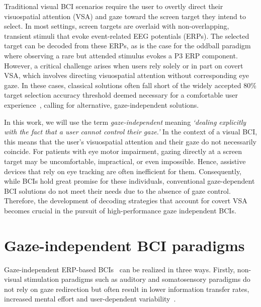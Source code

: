 Traditional visual BCI scenarios require the user to overtly direct their
visuospatial attention (VSA) and gaze toward the screen target they intend to select.
In most settings, screen targets are overlaid with non-overlapping, transient
stimuli that evoke event-related EEG potentials (ERPs).
The selected target can be decoded from these ERPs, as is the case for the
oddball paradigm where observing a rare but attended stimulus evokes a P3 ERP
component.
However, a critical challenge arises when users rely solely or in part on covert
VSA, which involves directing visuospatial attention without corresponding eye gaze.
In these cases, classical solutions often fall short of the widely accepted
80\% target selection accuracy threshold deemed necessary for a comfortable user
experience~\cite{Brunner2010,Frenzel2011,Treder2010,Ron2019,Neeling2019},
calling for alternative, gaze-independent solutions.

In this work, we will use the term \emph{gaze-independent} meaning
\emph{‘dealing explicitly with the fact that a user cannot control their
gaze.'}
In the context of a visual BCI, this means that the user's
visuospatial attention and their gaze do not necessarily coincide.
For patients with eye motor impairment, gazing directly at a screen target may
be uncomfortable, impractical, or even impossible.
Hence, assistive devices that rely on eye tracking are often inefficient for
them.
Consequently, while BCIs hold great promise for these individuals, conventional
gaze-dependent BCI solutions do not meet their needs due to the absence of gaze
control. Therefore, the development of decoding strategies that account for covert
VSA becomes crucial in the pursuit of high-performance gaze independent
BCIs.



\section{Gaze-independent BCI paradigms}
\label{sec:gaze-independence-paradigms}
Gaze-independent ERP-based BCIs~\cite{Riccio2012, Aloise2012} can be realized in three
ways. Firstly, non-visual stimulation paradigms such as auditory and somatosensory paradigms
do not rely on gaze redirection but often result in lower information transfer
rates, increased mental effort and user-dependent variability~\cite{Reichert2020b}.

